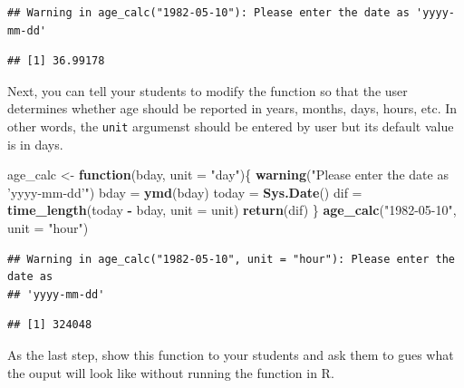 \documentclass[]{book}
\newenvironment{Shaded}{\begin{snugshade}}{\end{snugshade}}
\newcommand{\ControlFlowTok}[1]{\textcolor[rgb]{0.13,0.29,0.53}{\textbf{#1}}}
\newcommand{\DataTypeTok}[1]{\textcolor[rgb]{0.13,0.29,0.53}{#1}}
\newcommand{\KeywordTok}[1]{\textcolor[rgb]{0.13,0.29,0.53}{\textbf{#1}}}
\newcommand{\NormalTok}[1]{#1}
\newcommand{\OperatorTok}[1]{\textcolor[rgb]{0.81,0.36,0.00}{\textbf{#1}}}
\newcommand{\StringTok}[1]{\textcolor[rgb]{0.31,0.60,0.02}{#1}}
\begin{document}
\begin{verbatim}
## Warning in age_calc("1982-05-10"): Please enter the date as 'yyyy-mm-dd'
\end{verbatim}

\begin{verbatim}
## [1] 36.99178
\end{verbatim}

Next, you can tell your students to modify the function so that the user determines whether age should be reported in years, months, days, hours, etc. In other words, the \texttt{unit} argumenst should be entered by user but its default value is in days.

\begin{Shaded}
\begin{Highlighting}[]
\NormalTok{age_calc <-}\StringTok{ }\ControlFlowTok{function}\NormalTok{(bday, }\DataTypeTok{unit =} \StringTok{"day"}\NormalTok{)\{}
    \KeywordTok{warning}\NormalTok{(}\StringTok{"Please enter the date as 'yyyy-mm-dd'"}\NormalTok{)}
\NormalTok{    bday =}\StringTok{ }\KeywordTok{ymd}\NormalTok{(bday)}
\NormalTok{    today =}\StringTok{ }\KeywordTok{Sys.Date}\NormalTok{()}
\NormalTok{    dif =}\StringTok{ }\KeywordTok{time_length}\NormalTok{(today }\OperatorTok{-}\StringTok{ }\NormalTok{bday, }\DataTypeTok{unit =}\NormalTok{ unit)}
    \KeywordTok{return}\NormalTok{(dif)}
\NormalTok{\}}
\KeywordTok{age_calc}\NormalTok{(}\StringTok{"1982-05-10"}\NormalTok{, }\DataTypeTok{unit =} \StringTok{"hour"}\NormalTok{)}
\end{Highlighting}
\end{Shaded}

\begin{verbatim}
## Warning in age_calc("1982-05-10", unit = "hour"): Please enter the date as
## 'yyyy-mm-dd'
\end{verbatim}

\begin{verbatim}
## [1] 324048
\end{verbatim}

As the last step, show this function to your students and ask them to gues what the ouput will look like without running the function in R.
\end{document}
